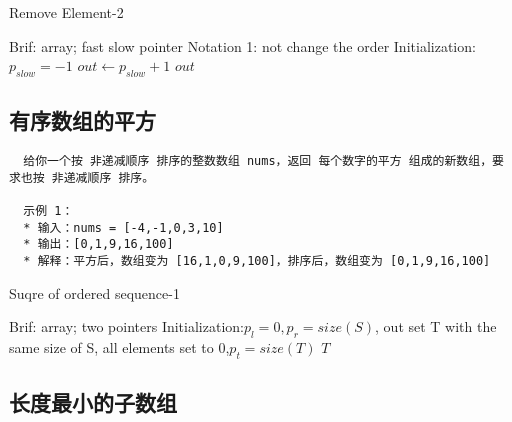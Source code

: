 \documentclass[UTF8]{../computerUniverse}
\begin{document}
\begin{algorithm}[h]%
  \caption{Remove Element-2}\label{algo:Remove Element-2}
  \SetAlgoLined
  Brif: array; fast slow pointer\;
  Notation 1: not change the order\;
  \KwIn{set $S = [l,r), l = S[0]$,  the removed number $t$.}
  Initialization:$p_{slow} = -1$\;
  \For {$p_{fast} : [0, size(S))$}{
   
    \If{$S[p_{fast}] \neq t$}{
      $p_{slow} \leftarrow p_{slow} +1$\;
      $ S[p_{slow}] = S[p_{fast}] $\;
    }
  }
  $out \leftarrow p_{slow}+1$\;
  \KwRet $out$\;
\end{algorithm}


\subsection{有序数组的平方}

\begin{lstlisting}
  给你一个按 非递减顺序 排序的整数数组 nums，返回 每个数字的平方 组成的新数组，要求也按 非递减顺序 排序。

  示例 1：
  * 输入：nums = [-4,-1,0,3,10]
  * 输出：[0,1,9,16,100]
  * 解释：平方后，数组变为 [16,1,0,9,100]，排序后，数组变为 [0,1,9,16,100]

\end{lstlisting}

\begin{algorithm}[h]%
  \caption{Suqre of ordered sequence-1}\label{algo:Suqre of ordered sequence-1}
  \SetAlgoLined
  Brif: array; two pointers\;
  \KwIn{ordered set $S = [l,r), l = S[0]$.}
  Initialization:$p_{l} = 0,p_{r} = size(S)$, out set T with the same size of S, all elements set to 0,$p_{t} = size(T)$\;
  \For {$i : [0, size(S))$}{
    $S[i] \leftarrow S[i] ^2$
  }
  \KwRet $T$\;
\end{algorithm}



\subsection{长度最小的子数组}
\end{document}

